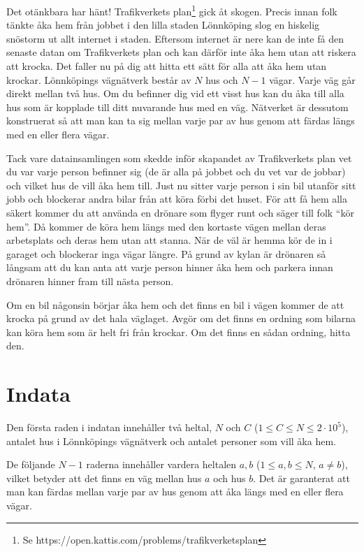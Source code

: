 \noindent
Det otänkbara har hänt! Trafikverkets plan\footnote{Se https://open.kattis.com/problems/trafikverketsplan} gick åt skogen. Precis innan folk tänkte åka hem från jobbet i den lilla staden Lönnköping slog en hiskelig snöstorm ut
allt internet i staden. Eftersom internet är nere kan de inte få den senaste datan om Trafikverkets plan och kan därför inte
åka hem utan att riskera att krocka.
Det faller nu på dig att hitta ett sätt för alla att åka hem utan krockar. Lönnköpings vägnätverk består av $N$ hus och $N-1$ vägar. Varje väg går direkt mellan två hus.
Om du befinner dig vid ett visst hus kan du åka till alla hus som är kopplade till ditt nuvarande hus med en väg. Nätverket är dessutom konstruerat så att
man kan ta sig mellan varje par av hus genom att färdas längs med en eller flera vägar.

Tack vare datainsamlingen som skedde inför skapandet av Trafikverkets plan vet du var varje person befinner sig
(de är alla på jobbet och du vet var de jobbar) och vilket hus de vill åka hem till. Just nu sitter varje person i sin bil utanför sitt jobb och blockerar andra bilar från att köra förbi det huset.
För att få hem alla säkert kommer du att använda en drönare som flyger runt och säger till folk ``kör hem''. Då kommer de köra hem längs med den kortaste vägen mellan deras arbetsplats
och deras hem utan att stanna. När de väl är hemma kör de in i garaget och blockerar inga vägar längre. På grund av kylan är drönaren så långsam att du kan anta
att varje person hinner åka hem och parkera innan drönaren hinner fram till nästa person.

Om en bil någonsin börjar åka hem och det finns en bil i vägen kommer de att krocka på grund av det hala väglaget. Avgör om det finns en ordning som bilarna kan
köra hem som är helt fri från krockar. Om det finns en sådan ordning, hitta den.

\section*{Indata}
Den första raden i indatan innehåller två heltal, $N$ och $C$ ($1 \le C \leq N \le 2 \cdot 10^5$), antalet hus i Lönnköpings vägnätverk
och antalet personer som vill åka hem. 

De följande $N-1$ raderna innehåller vardera heltalen $a,b$ ($1 \leq a,b \leq N$, $a \neq b$),
vilket betyder att det finns en väg mellan hus $a$ och hus $b$. Det är garanterat att man kan färdas
mellan varje par av hus genom att åka längs med en eller flera vägar.

